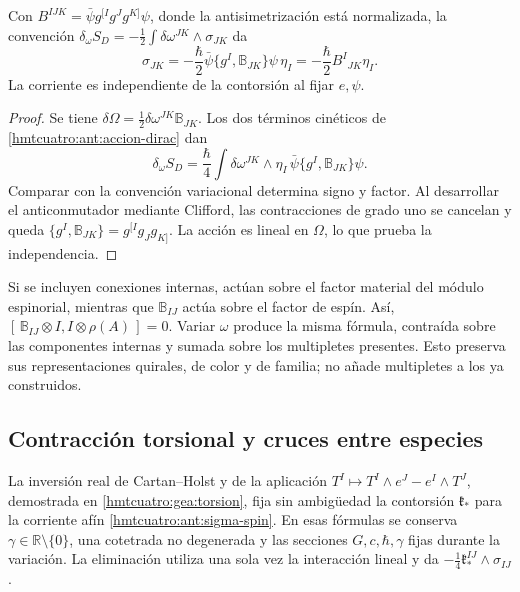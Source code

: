 \begin{proposition}
\label{hmtcuatro:ant:corriente-spin}
Con \(B^{IJK}=\bar\psi g^{[I}g^Jg^{K]}\psi\), donde la
antisimetrización está normalizada, la convención
\(\delta_\omega S_D=-\frac12\int\delta\omega^{JK}\wedge\sigma_{JK}\)
da
\begin{equation}
 \sigma_{JK}
 =-\frac{\hbar}{2}\bar\psi\{g^I,\mathbb B_{JK}\}\psi\,\eta_I
 =-\frac{\hbar}{2}B^I{}_{JK}\eta_I .
 \label{hmtcuatro:ant:sigma-spin}
\end{equation}
La corriente es independiente de la contorsión al fijar \(e,\psi\).
\end{proposition}
\begin{proof}
Se tiene
\(\delta\Omega=\frac12\delta\omega^{JK}\mathbb B_{JK}\).
Los dos términos cinéticos de \eqref{hmtcuatro:ant:accion-dirac}
dan
\[
 \delta_\omega S_D=\frac{\hbar}{4}\int
 \delta\omega^{JK}\wedge\eta_I\,
          \bar\psi\{g^I,\mathbb B_{JK}\}\psi .
\]
Comparar con la convención variacional determina signo y factor.
Al desarrollar el anticonmutador mediante Clifford, las
contracciones de grado uno se cancelan y queda
\(\{g^I,\mathbb B_{JK}\}=g^{[I}g_Jg_{K]}\).
La acción es lineal en \(\Omega\), lo que prueba la independencia.
\end{proof}

Si se incluyen conexiones internas, actúan sobre el factor
material del módulo espinorial, mientras que
\(\mathbb B_{IJ}\) actúa sobre el factor de espín. Así,
\([\,\mathbb B_{IJ}\otimes I,I\otimes\rho(A)\,]=0\).
Variar \(\omega\) produce la misma fórmula, contraída sobre
las componentes internas y sumada sobre los multipletes presentes.
Esto preserva sus representaciones quirales, de color y de familia;
no añade multipletes a los ya construidos.

\subsection{Contracción torsional y cruces entre especies}
\label{hmtcuatro:ant:contraccion}

La inversión real de Cartan--Holst y de la aplicación
\(T^I\mapsto T^I\wedge e^J-e^I\wedge T^J\), demostrada en
\ref{hmtcuatro:gea:torsion}, fija sin ambigüedad la contorsión
\(\mathfrak k_*\) para la corriente afín
\eqref{hmtcuatro:ant:sigma-spin}. En esas fórmulas se conserva
\(\gamma\in\mathbb R\setminus\{0\}\), una cotetrada no degenerada
y las secciones \(G,c,\hbar,\gamma\) fijas durante la variación.
La eliminación utiliza una sola vez la interacción lineal y da
\(-\frac14\mathfrak k_*^{IJ}\wedge\sigma_{IJ}\).

